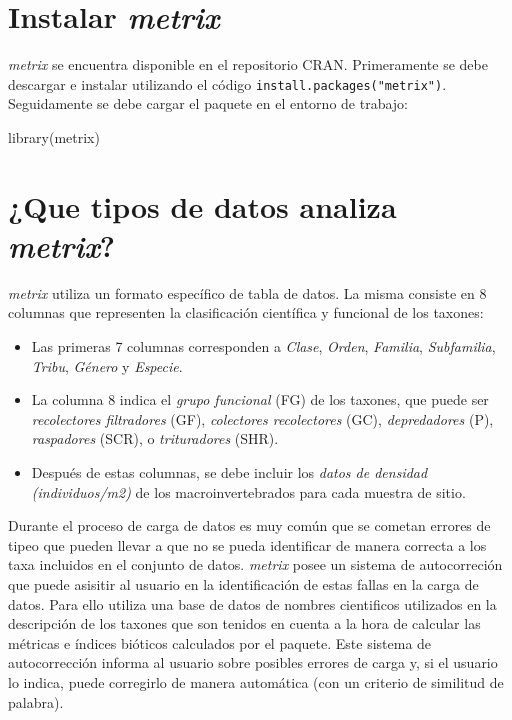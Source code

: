 \documentclass[
]{book}
\newenvironment{Shaded}{\begin{snugshade}}{\end{snugshade}}
\newcommand{\FunctionTok}[1]{\textcolor[rgb]{0.00,0.00,0.00}{#1}}
\newcommand{\NormalTok}[1]{#1}
\begin{document}
\hypertarget{instalar-metrix}{%
\section{\texorpdfstring{Instalar \emph{metrix}}{Instalar metrix}}\label{instalar-metrix}}

\emph{metrix} se encuentra disponible en el repositorio CRAN.
Primeramente se debe descargar e instalar utilizando el código \texttt{install.packages("metrix")}.
Seguidamente se debe cargar el paquete en el entorno de trabajo:

\begin{Shaded}
\begin{Highlighting}[]
\FunctionTok{library}\NormalTok{(metrix)}
\end{Highlighting}
\end{Shaded}

\hypertarget{que-tipos-de-datos-analiza-metrix}{%
\section{\texorpdfstring{¿Que tipos de datos analiza \emph{metrix}?}{¿Que tipos de datos analiza metrix?}}\label{que-tipos-de-datos-analiza-metrix}}

\emph{metrix} utiliza un formato específico de tabla de datos.
La misma consiste en 8 columnas que representen la clasificación científica y funcional de los taxones:

\begin{itemize}
\item
  Las primeras 7 columnas corresponden a \emph{Clase}, \emph{Orden}, \emph{Familia}, \emph{Subfamilia}, \emph{Tribu}, \emph{Género} y \emph{Especie}.
\item
  La columna 8 indica el \emph{grupo funcional} (FG) de los taxones, que puede ser \emph{recolectores filtradores} (GF), \emph{colectores recolectores} (GC), \emph{depredadores} (P), \emph{raspadores} (SCR), o \emph{trituradores} (SHR).
\item
  Después de estas columnas, se debe incluir los \emph{datos de densidad (individuos/m2)} de los macroinvertebrados para cada muestra de sitio.
\end{itemize}

Durante el proceso de carga de datos es muy común que se cometan errores de tipeo que pueden llevar a que no se pueda identificar de manera correcta a los taxa incluidos en el conjunto de datos.
\emph{metrix} posee un sistema de autocorreción que puede asisitir al usuario en la identificación de estas fallas en la carga de datos.
Para ello utiliza una base de datos de nombres cientificos utilizados en la descripción de los taxones que son tenidos en cuenta a la hora de calcular las métricas e índices bióticos calculados por el paquete.
Este sistema de autocorrección informa al usuario sobre posibles errores de carga y, si el usuario lo indica, puede corregirlo de manera automática (con un criterio de similitud de palabra).
\end{document}
